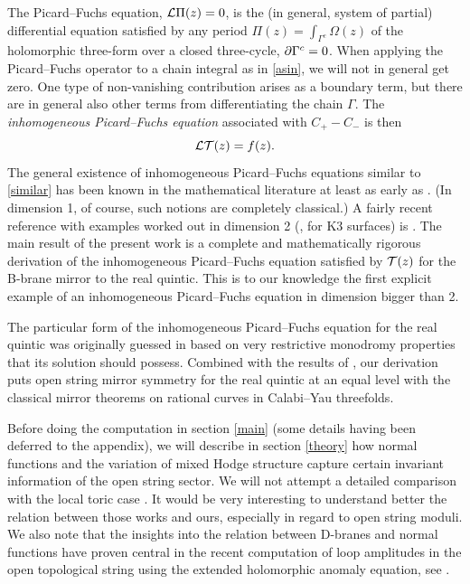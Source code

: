 The Picard--Fuchs equation, ${\cal L}\Pi(z)=0$, is the (in general, system of
partial) differential equation satisfied by any period $\Pi(z)=
\int_{\Gamma^c}\Omega(z)$ of the holomorphic three-form over a 
closed three-cycle, $\partial\Gamma^c=0$. When applying the Picard--Fuchs 
operator to a chain integral as in \eqref{asin}, we will not in general 
get zero. One type of non-vanishing contribution arises as a boundary 
term, but there are in general also other terms from differentiating 
the chain $\Gamma$. The {\it inhomogeneous Picard--Fuchs equation}
associated with $C_+-C_-$ is then
\begin{equation}
\eqlabel{similar}
\call\calt(z) = f(z) .
\end{equation}
The general existence of inhomogeneous Picard--Fuchs equations similar to
\eqref{similar} has been known in the mathematical literature at least as 
early as \cite{griffithsdiff}. (In dimension 1, of course, such notions
are completely classical.) A fairly recent reference with examples worked
out in dimension 2 (\ie, for K3 surfaces) is \cite{muellerdelangel}. The 
main result of the present work is a complete and mathematically rigorous 
derivation of the inhomogeneous Picard--Fuchs equation satisfied by ${\cal T}(z)$ 
for the B-brane mirror to the real quintic. This is to our knowledge the first 
explicit example of an inhomogeneous Picard--Fuchs equation in dimension 
bigger than 2.

The particular form of the inhomogeneous Picard--Fuchs equation for
the real quintic was originally guessed in \cite{open} based on very 
restrictive monodromy properties that its solution should possess. 
Combined with the results of \cite{psw}, our derivation puts open 
string mirror symmetry for the real quintic at an equal level with 
the classical mirror theorems on rational curves in Calabi--Yau threefolds.

Before doing the computation in section \ref{main} (some details having
been deferred to the appendix), we will describe 
in section \ref{theory} how normal functions and the variation of mixed 
Hodge structure capture certain invariant information of the open string 
sector. We will not attempt a detailed comparison with the local toric 
case \cite{lmw1,lmw2}. It would be very interesting to understand better 
the relation between those works and ours, especially in regard to open 
string moduli. We also note that the insights into the relation between 
D-branes and normal functions have proven central in the recent computation 
of loop amplitudes in the open topological string using the extended 
holomorphic anomaly equation, see \cite{extended}.

